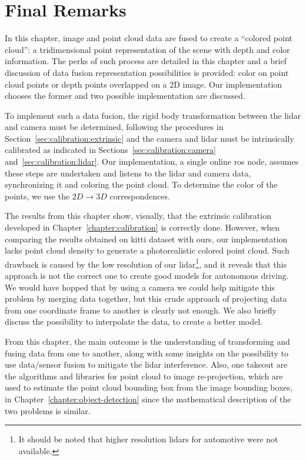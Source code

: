 \section{Final Remarks}
In this chapter, image and point cloud data are fused to create a ``colored point cloud'': a tridimensional point representation of the scene with depth and color information. The perks of such process are detailed in this chapter and a brief discussion of data fusion representation possibilities is provided: color on point cloud points or depth points overlapped on a 2D image. Our implementation chooses the former and two possible implementation are discussed.  

To implement such a data fusion, the rigid body transformation between the \ac{lidar} and camera must be determined, following the procedures in Section~\ref{sec:calibration:extrinsic} and the camera and \ac{lidar} must be intrinsically calibrated as indicated in Sections~\ref{sec:calibration:camera} and~\ref{sec:calibration:lidar}. Our implementation, a single online \ac{ros} node, assumes these steps are undertaken and listens to the \ac{lidar} and camera data, synchronizing it and coloring the point cloud. To determine the color of the points, we use the $2D \rightarrow 3D$ correspondences.

The results from this chapter show, visually, that the extrinsic calibration developed in Chapter~\ref{chapter:calibration} is correctly done. However, when comparing the results obtained on \ac{kitti} dataset with ours, our implementation lacks point cloud density to generate a photorealistic colored point cloud. Such drawback is caused by the low resolution of our \ac{lidar}\footnote{It should be noted that higher resolution \acp{lidar} for automotive were not available.}, and it reveals that this approach is not the correct one to create good models for autonomous driving. We would have hopped that by using a camera we could help mitigate this problem by merging data together, but this crude approach of projecting data from one coordinate frame to another is clearly not enough. We also briefly discuss the possibility to interpolate the data, to create a better model.


From this chapter, the main outcome is the understanding of transforming and fusing data from one to another, along with some insights on the possibility to use data/sensor fusion to mitigate the \ac{lidar} interference. Also, one takeout are the algorithms and libraries for point cloud to image re-projection, which are used to estimate the point cloud bounding box from the image bounding boxes, in Chapter~\ref{chapter:object-detection} since the mathematical description of the two problems is similar.
